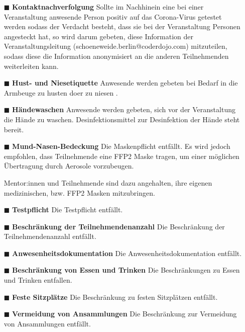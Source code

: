 \documentclass{coderdojoschoeneweide}
\begin{document}
\begin{Form}
\begin{itemize}
           \item[$\blacksquare$] \textbf{Kontaktnachverfolgung} Sollte im Nachhinein eine bei einer Veranstaltung anwesende Person positiv auf das Corona-Virus getestet werden sodass der Verdacht besteht, dass sie bei der Veranstaltung Personen angesteckt hat, so wird darum gebeten, diese Information der Veranstaltungsleitung (schoeneweide.berlin@coderdojo.com) mitzuteilen, sodass diese die Information anonymisiert an die anderen Teilnehmenden weiterleiten kann.

            \item[$\blacksquare$] \textbf{Hust- und Niesetiquette} Anwesende werden gebeten bei Bedarf in die Armbeuge zu husten doer zu niesen .

            \item[$\blacksquare$] \textbf{Händewaschen} Anwesende werden gebeten, sich vor der Veranstaltung die Hände zu waschen. Desinfektionsmittel zur Desinfektion der Hände steht bereit.

            \item[$\blacksquare$] \textbf{Mund-Nasen-Bedeckung} Die Maskenpflicht entfällt. Es wird jedoch empfohlen, dass Teilnehmende eine FFP2 Maske tragen, um einer möglichen Übertragung durch Aerosole vorzubeugen. 

            Mentor:innen und Teilnehmende sind dazu angehalten, ihre eigenen medizinischen, bzw. FFP2 Masken mitzubringen.

           \item[$\blacksquare$] \textbf{Testpflicht} Die Testpflicht entfällt.

           \item[$\blacksquare$] \textbf{Beschränkung der Teilnehmendenanzahl} Die Beschränkung der Teilnehmendenanzahl entfällt.

           \item[$\blacksquare$] \textbf{Anwesenheitsdokumentation} Die Anwesenheitsdokumentation entfällt.

           \item[$\blacksquare$] \textbf{Beschränkung von Essen und Trinken } Die Beschränkungen zu Essen und Trinken entfallen.

           \item[$\blacksquare$] \textbf{Feste Sitzplätze} Die Beschränkung zu festen Sitzplätzen entfällt.

           \item[$\blacksquare$] \textbf{Vermeidung von Ansammlungen} Die Beschränkung zur Vermeidung von Ansammlungen entfällt.
		\end{itemize}

	\end{Form}
\end{document}
